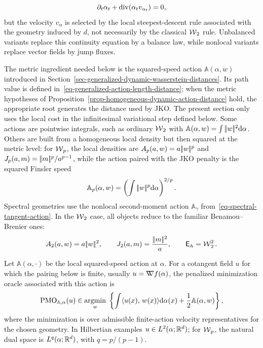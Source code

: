 \begin{equation}\label{eq-generalized-flow-continuity-motivation}
	\partial_t\alpha_t+\operatorname{div}(\alpha_t v_{\alpha_t})=0,
\end{equation}
but the velocity \(v_{\alpha}\) is selected by the local steepest-descent rule associated with the geometry induced by \(d\), not necessarily by the classical \(\operatorname{\mathcal{W}}_2\) rule. Unbalanced variants replace this continuity equation by a balance law, while nonlocal variants replace vector fields by jump fluxes.

The metric ingredient needed below is the squared-speed action $\mathbb A(\alpha,w)$ introduced in Section~\ref{sec-generalized-dynamic-wasserstein-distances}. Its path value is defined in~\eqref{eq-generalized-action-length-distance}; when the metric hypotheses of Proposition~\ref{prop-homogeneous-dynamic-action-distance} hold, the appropriate root generates the distance used by JKO. The present section only uses the local cost in the infinitesimal variational step defined below. Some actions are pointwise integrals, such as ordinary $\operatorname{\mathcal{W}}_2$ with $\mathbb A(\alpha,w)=\int|\!| w |\!|^2\mathrm{d}\alpha$. Others are built from a homogeneous local density but then squared at the metric level: for $\operatorname{\mathcal{W}}_p$, the local densities are \(A_p(a,w)=a|\!| w |\!|^p\) and \(J_p(a,m)=|\!| m |\!|^p/a^{p-1}\), while the action paired with the JKO penalty is the squared Finsler speed
\[
	\mathbb A_p(\alpha,w)=\left(\int|\!| w |\!|^p\mathrm{d}\alpha\right)^{2/p}.
\]
Spectral geometries use the nonlocal second-moment action \(\mathbb A_\gamma\) from~\eqref{eq-spectral-tangent-action}.
In the \(\operatorname{\mathcal{W}}_2\) case, all objects reduce to the familiar Benamou--Brenier ones:
\[
	A_2(a,w)=a|\!| w |\!|^2,
	\qquad
	J_2(a,m)=\frac{|\!| m |\!|^2}{a},
	\qquad
	\mathsf E_{\mathbb A}=\operatorname{\mathcal{W}}_2^2.
\]

\begin{defn}\label{def-generalized-action-steepest-direction}
	Let \(\mathbb A(\alpha,\cdot)\) be the local squared-speed action at \(\alpha\). For a cotangent field \(u\) for which the pairing below is finite, usually \(u=\mathord{\nabla\mkern-9.3mu\nabla} f(\alpha)\), the penalized minimization oracle associated with this action is
	\begin{equation}\label{eq-local-action-steepest-descent}
		\operatorname{PMO}_{\mathbb A,\alpha}(u)
		\in
		\underset{w}{\operatorname{argmin}}\;
		\left\{
		\int \langle u(x),\,w(x)\rangle\mathrm{d}\alpha(x)
		+
		\frac12\mathbb A(\alpha,w)
		\right\},
	\end{equation}
	where the minimization is over admissible finite-action velocity representatives for the chosen geometry. In Hilbertian examples \(u\in L^2(\alpha;\mathbb{R}^d)\); for \(\operatorname{\mathcal{W}}_p\), the natural dual space is \(L^q(\alpha;\mathbb{R}^d)\), with \(q=p/(p-1)\).
\end{defn}

